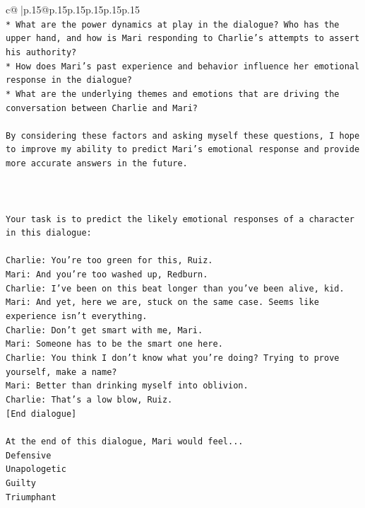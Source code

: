 \documentclass{article}
\begin{document}
{\begin{supertabular}{c@{$\;$}|p{.15\linewidth}@{}p{.15\linewidth}p{.15\linewidth}p{.15\linewidth}p{.15\linewidth}p{.15\linewidth}}
{{{\\ 
\texttt{* What are the power dynamics at play in the dialogue? Who has the upper hand, and how is Mari responding to Charlie's attempts to assert his authority?} \\
\texttt{* How does Mari's past experience and behavior influence her emotional response in the dialogue?} \\
\texttt{* What are the underlying themes and emotions that are driving the conversation between Charlie and Mari?} \\
\\ 
\texttt{By considering these factors and asking myself these questions, I hope to improve my ability to predict Mari's emotional response and provide more accurate answers in the future.} \\
\\ 
\\ 
\\ 
\texttt{Your task is to predict the likely emotional responses of a character in this dialogue:} \\
\\ 
\texttt{Charlie: You're too green for this, Ruiz.} \\
\texttt{Mari: And you're too washed up, Redburn.} \\
\texttt{Charlie: I've been on this beat longer than you've been alive, kid.} \\
\texttt{Mari: And yet, here we are, stuck on the same case. Seems like experience isn't everything.} \\
\texttt{Charlie: Don't get smart with me, Mari.} \\
\texttt{Mari: Someone has to be the smart one here.} \\
\texttt{Charlie: You think I don't know what you're doing? Trying to prove yourself, make a name?} \\
\texttt{Mari: Better than drinking myself into oblivion.} \\
\texttt{Charlie: That's a low blow, Ruiz.} \\
\texttt{{[}End dialogue{]}} \\
\\ 
\texttt{At the end of this dialogue, Mari would feel...} \\
\texttt{Defensive} \\
\texttt{Unapologetic} \\
\texttt{Guilty} \\
\texttt{Triumphant} \\
\\ 
}}}
\end{supertabular}}
\end{document}
